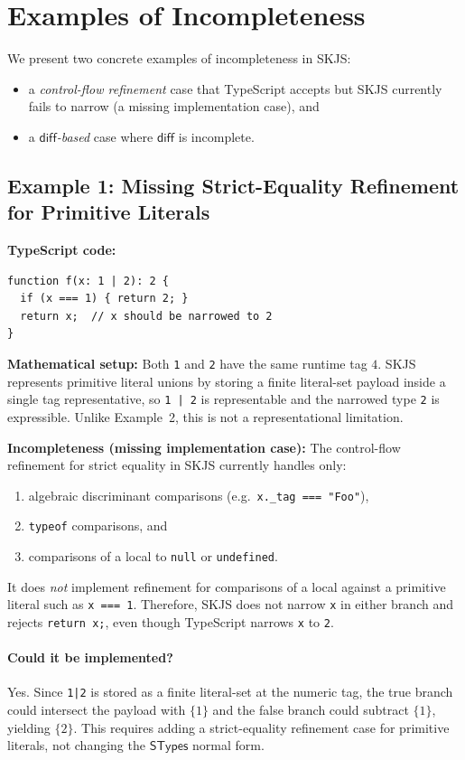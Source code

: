\documentclass[11pt]{article}
\newcommand{\diff}{\mathsf{diff}}
\newcommand{\STypes}{\mathsf{STypes}}
\begin{document}
\section{Examples of Incompleteness}

We present two concrete examples of incompleteness in SKJS:
\begin{itemize}
\item a \emph{control-flow refinement} case that TypeScript accepts but SKJS currently fails to narrow (a missing implementation case), and
\item a \emph{$\diff$-based} case where $\diff$ is incomplete.
\end{itemize}

\subsection{Example 1: Missing Strict-Equality Refinement for Primitive Literals}

\textbf{TypeScript code:}
\begin{verbatim}
function f(x: 1 | 2): 2 {
  if (x === 1) { return 2; }
  return x;  // x should be narrowed to 2
}
\end{verbatim}

\textbf{Mathematical setup:}
Both \texttt{1} and \texttt{2} have the same runtime tag $4$.
SKJS represents primitive literal unions by storing a finite literal-set payload inside a single tag representative, so \texttt{1 | 2} is representable and the narrowed type \texttt{2} is expressible.
Unlike Example~2, this is not a representational limitation.

\textbf{Incompleteness (missing implementation case):}
The control-flow refinement for strict equality in SKJS currently handles only:
\begin{enumerate}
\item algebraic discriminant comparisons (e.g.\ \texttt{x.\_tag === "Foo"}),
\item \texttt{typeof} comparisons, and
\item comparisons of a local to \texttt{null} or \texttt{undefined}.
\end{enumerate}
It does \emph{not} implement refinement for comparisons of a local against a primitive literal such as \texttt{x === 1}.
Therefore, SKJS does not narrow \texttt{x} in either branch and rejects \texttt{return x;}, even though TypeScript narrows \texttt{x} to \texttt{2}.

\paragraph{Could it be implemented?}
Yes. Since \texttt{1|2} is stored as a finite literal-set at the numeric tag, the true branch could intersect the payload with \(\{1\}\) and the false branch could subtract \(\{1\}\), yielding \(\{2\}\).
This requires adding a strict-equality refinement case for primitive literals, not changing the \(\STypes\) normal form.
\end{document}
